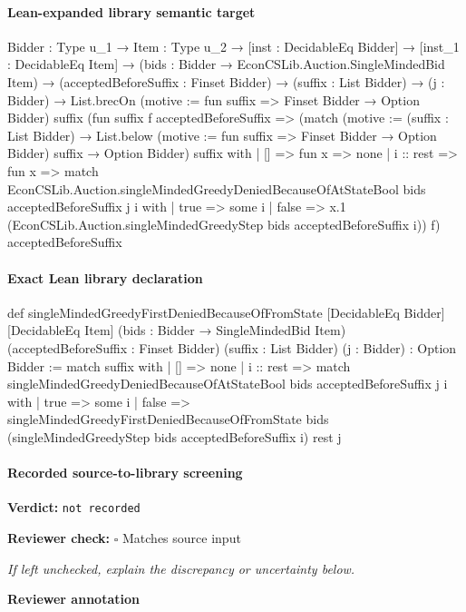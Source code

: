 \documentclass[10pt]{article}
\newcommand{\reviewerbox}{%
  \par\noindent\fbox{\parbox{0.96\linewidth}{\rule{0pt}{0.38in}}}\par
}
\newcommand{\reviewmatch}[1]{%
  \par\noindent\textbf{Reviewer check:} $\square$\; #1\par
  \noindent\emph{If left unchecked, explain the discrepancy or uncertainty below.}\par
}
\begin{document}
\paragraph{Lean-expanded library semantic target}
\begin{ReviewVerbatim}
{Bidder : Type u_1} →
  {Item : Type u_2} →
    [inst : DecidableEq Bidder] →
      [inst_1 : DecidableEq Item] →
        (bids : Bidder → EconCSLib.Auction.SingleMindedBid Item) →
          (acceptedBeforeSuffix : Finset Bidder) →
            (suffix : List Bidder) →
              (j : Bidder) →
                List.brecOn (motive := fun suffix => Finset Bidder → Option Bidder) suffix
                  (fun suffix f acceptedBeforeSuffix =>
                    (match (motive :=
                        (suffix : List Bidder) →
                          List.below (motive := fun suffix => Finset Bidder → Option Bidder) suffix → Option Bidder)
                        suffix with
                      | [] => fun x => none
                      | i :: rest => fun x =>
                        match
                          EconCSLib.Auction.singleMindedGreedyDeniedBecauseOfAtStateBool bids acceptedBeforeSuffix j
                            i with
                        | true => some i
                        | false => x.1 (EconCSLib.Auction.singleMindedGreedyStep bids acceptedBeforeSuffix i))
                      f)
                  acceptedBeforeSuffix
\end{ReviewVerbatim}

\paragraph{Exact Lean library declaration}
\begin{ReviewVerbatim}
def singleMindedGreedyFirstDeniedBecauseOfFromState
    [DecidableEq Bidder] [DecidableEq Item]
    (bids : Bidder → SingleMindedBid Item)
    (acceptedBeforeSuffix : Finset Bidder)
    (suffix : List Bidder) (j : Bidder) : Option Bidder :=
  match suffix with
  | [] => none
  | i :: rest =>
      match singleMindedGreedyDeniedBecauseOfAtStateBool
          bids acceptedBeforeSuffix j i with
      | true => some i
      | false =>
          singleMindedGreedyFirstDeniedBecauseOfFromState bids
            (singleMindedGreedyStep bids acceptedBeforeSuffix i) rest j
\end{ReviewVerbatim}

\paragraph{Recorded source-to-library screening}
\textbf{Verdict:} \texttt{not recorded}
\reviewmatch{Matches source input}
\noindent\textbf{Reviewer annotation}\par
\reviewerbox
\clearpage
\hypertarget{library-prerequisite-65721fccaead1a9e}{}
\end{document}
